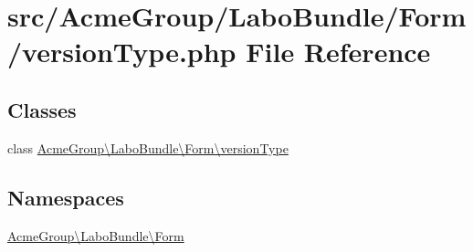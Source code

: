 \hypertarget{version_type_8php}{\section{src/\+Acme\+Group/\+Labo\+Bundle/\+Form/version\+Type.php File Reference}
\label{version_type_8php}
}
\subsection*{Classes}
\begin{DoxyCompactItemize}
\item 
class \hyperlink{class_acme_group_1_1_labo_bundle_1_1_form_1_1version_type}{Acme\+Group\textbackslash{}\+Labo\+Bundle\textbackslash{}\+Form\textbackslash{}version\+Type}
\end{DoxyCompactItemize}
\subsection*{Namespaces}
\begin{DoxyCompactItemize}
\item 
 \hyperlink{namespace_acme_group_1_1_labo_bundle_1_1_form}{Acme\+Group\textbackslash{}\+Labo\+Bundle\textbackslash{}\+Form}
\end{DoxyCompactItemize}
